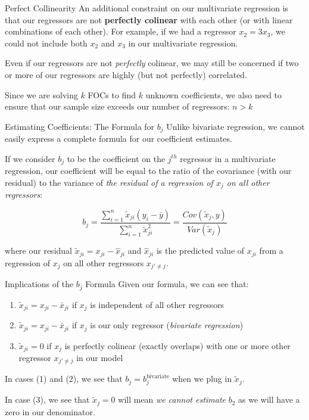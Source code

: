 \documentclass[
  ignorenonframetext,
  english,
]{beamer}
\begin{document}
\begin{frame}{Perfect Collinearity}
\protect{}\label{perfect-collinearity}
An additional constraint on our multivariate regression is that our
regressors are not \textbf{perfectly colinear} with each other (or with
linear combinations of each other). For example, if we had a regressor
\(x_2=3x_3\), we could not include both \(x_2\) and \(x_3\) in our
multivariate regression.

Even if our regressors are not \emph{perfectly} colinear, we may still
be concerned if two or more of our regressors are highly (but not
perfectly) correlated.

Since we are solving \(k\) FOCs to find \(k\) unknown coefficients, we
also need to ensure that our sample size exceeds our number of
regressors: \(n>k\)
\end{frame}

\begin{frame}{Estimating Coefficients: The Formula for \(b_j\)}
\protect{}\label{estimating-coefficients-the-formula-for-b_j}
Unlike bivariate regression, we cannot easily express a complete formula
for our coefficient estimates.

If we consider \(b_j\) to be the coefficient on the \(j^{th}\) regressor
in a multivariate regression, our coefficient will be equal to the ratio
of the covariance (with our residual) to the variance of \emph{the
residual of a regression of \(x_j\) on all other regressors}:

\[b_j=\frac{\sum_{i=1}^n\tilde{x}_{ji}(y_i-\bar{y})}{\sum_{i=1}^n\tilde{x}_{ji}^2}=\frac{Cov(\tilde{x}_j,y)}{Var(\tilde{x}_j)}\]

where our residual \(\tilde{x}_{ji}=x_{ji}-\hat{x}_{ji}\) and
\(\hat{x}_{ji}\) is the predicted value of \(x_{ji}\) from a regression
of \(x_j\) on all other regressors \(x_{j'\neq j}\).
\end{frame}

\begin{frame}{Implications of the \(b_j\) Formula}
\protect{}\label{implications-of-the-b_j-formula}
Given our formula, we can see that:

\begin{enumerate}
[1)]
\item
  \(\tilde{x}_{ji}=x_{ji}-\bar{x}_{ji}\) if \(x_j\) is independent of
  all other regressors
\item
  \(\tilde{x}_{ji}=x_{ji}-\bar{x}_{ji}\) if \(x_j\) is our only
  regressor (\emph{bivariate regression})
\item
  \(\tilde{x}_{ji}=0\) if \(x_j\) is perfectly colinear (exactly
  overlaps) with one or more other regressor \(x_{j'\neq j}\) in our
  model
\end{enumerate}

In cases (1) and (2), we see that \(b_j=b_j^{\text{bivariate}}\) when we
plug in \(\tilde{x}_j\).

In case (3), we see that \(\tilde{x}_j=0\) will mean \emph{we cannot
estimate} \(b_2\) as we will have a zero in our denominator.
\end{frame}
\end{document}
